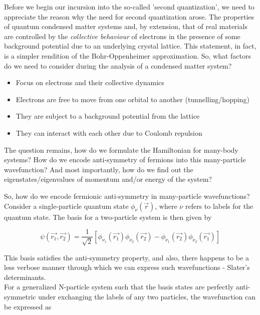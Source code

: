 \documentclass{resonance}
\begin{document}
Before we begin our incursion into the so-called 'second quantization', we need to appreciate the reason why the need for second quantization arose. The properties of quantum condensed matter systems and, by extension, that of real materials are controlled by the \textit{collective behaviour} of electrons in the presence of some background potential due to an underlying crystal lattice. This statement, in fact, is a simpler rendition of the Bohr-Oppenheimer approximation. So, what factors do we need to consider during the analysis of a condensed matter system?
\begin{itemize}
    \item Focus on electrons and their collective dynamics
    \item Electrons are free to move from one orbital to another (tunnelling/hopping)
    \item They are subject to a background potential from the lattice
    \item They can interact with each other due to Coulomb repulsion
\end{itemize}
The question remains, how do we formulate the Hamiltonian for many-body systems? How do we encode anti-symmetry of fermions into this many-particle wavefunction? And most importantly, how do we find out the eigenstates/eigenvalues of momentum and/or energy of the system?  \par

So, how do we encode fermionic anti-symmetry in many-particle wavefunctions? \\
Consider a single-particle quantum state $\phi_{\nu}(\vec{r})$, where $\nu$ refers to labels for the quantum state. The basis for a two-particle system is then given by 

\begin{equation*}
    \psi(\vec{r_{1}}, \vec{r_{2}}) = \frac{1}{\sqrt{2}}[\phi_{\nu_{1}}(\vec{r_{1}}) \phi_{\nu_{2}}(\vec{r_{2}}) - \phi_{\nu_{1}}(\vec{r_{2}}) \phi_{\nu_{2}}(\vec{r_{1}})]
\end{equation*}

This basis satisfies the anti-symmetry property, and also, there happens to be a less verbose manner through which we can express such wavefunctions - Slater's determinants. \\
For a generalized N-particle system such that the basis states are perfectly anti-symmetric under exchanging the labels of any two particles, the wavefunction can be expressed as
\end{document}
